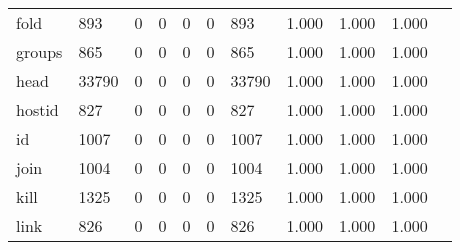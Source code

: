 \begin{longtable}{lp{1.10cm}p{1.10cm}p{1.10cm}p{1.10cm}p{1.10cm}p{1.10cm}p{1.10cm}p{1.10cm}p{1.10cm}p{1.10cm}}
fold      &                    893 &                                  0 &                                 0 &                                0 &                                 0 &                             893 &                             1.000 &                                 1.000 &                               1.000 \\
groups    &                    865 &                                  0 &                                 0 &                                0 &                                 0 &                             865 &                             1.000 &                                 1.000 &                               1.000 \\
head      &                  33790 &                                  0 &                                 0 &                                0 &                                 0 &                           33790 &                             1.000 &                                 1.000 &                               1.000 \\
hostid    &                    827 &                                  0 &                                 0 &                                0 &                                 0 &                             827 &                             1.000 &                                 1.000 &                               1.000 \\
id        &                   1007 &                                  0 &                                 0 &                                0 &                                 0 &                            1007 &                             1.000 &                                 1.000 &                               1.000 \\
join      &                   1004 &                                  0 &                                 0 &                                0 &                                 0 &                            1004 &                             1.000 &                                 1.000 &                               1.000 \\
kill      &                   1325 &                                  0 &                                 0 &                                0 &                                 0 &                            1325 &                             1.000 &                                 1.000 &                               1.000 \\
link      &                    826 &                                  0 &                                 0 &                                0 &                                 0 &                             826 &                             1.000 &                                 1.000 &                               1.000 \\

\end{longtable}
